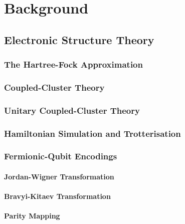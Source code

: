 \chapter{\label{background}Background}

\section{Electronic Structure Theory}
\subsection{The Hartree-Fock Approximation}
\subsection{Coupled-Cluster Theory}
\subsection{Unitary Coupled-Cluster Theory}
\subsection{Hamiltonian Simulation and Trotterisation}

\subsection{Fermionic-Qubit Encodings}
\subsubsection{Jordan-Wigner Transformation}
\subsubsection{Bravyi-Kitaev Transformation}
\subsubsection{Parity Mapping}



